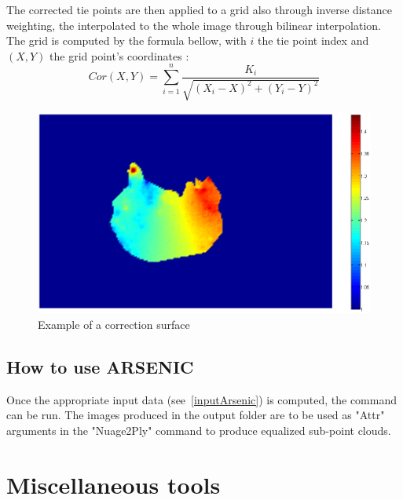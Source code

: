 The corrected tie points are then applied to a grid also through inverse distance weighting, the interpolated to the whole image through bilinear interpolation. The grid is computed by the formula bellow, with $i$ the tie point index and $(X,Y)$ the grid point's coordinates : \[Cor(X,Y)=\sum_{i=1}^{n} \frac{K_{i}}{\sqrt{(X_{i}-X)^2+(Y_{i}-Y)^2}}\]

\begin{figure}[H]
\centering
\includegraphics[width=15cm]{FIGS/Arsenic/SurfCorr.png}
\caption{Example of a correction surface}
\label{SurfCorr}
\end{figure}


\subsection{How to use ARSENIC}

Once the appropriate input data (see~\ref{inputArsenic}) is computed, the command can be run. The images produced in the output folder are to be used as "Attr" arguments in the "Nuage2Ply" command to produce equalized sub-point clouds.

\section{Miscellaneous tools}

